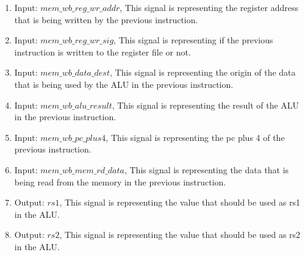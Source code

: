 \begin{enumerate}[label={\textbullet}]
    \item Input: $mem\_wb\_reg\_wr\_addr$, This signal is representing the register address that is being written by the previous instruction.
    \item Input: $mem\_wb\_reg\_wr\_sig$, This signal is representing if the previous instruction is written to the register file or not.
    \item Input: $mem\_wb\_data\_dest$, This signal is representing the origin of the data that is being used by the ALU in the previous instruction.
    \item Input: $mem\_wb\_alu\_result$, This signal is representing the result of the ALU in the previous instruction.
    \item Input: $mem\_wb\_pc\_plus4$, This signal is representing the pc plus 4 of the previous instruction.
    \item Input: $mem\_wb\_mem\_rd\_data$, This signal is representing the data that is being read from the memory in the previous instruction.
    \item Output: $rs1$, This signal is representing the value that should be used as rs1 in the ALU.
    \item Output: $rs2$, This signal is representing the value that should be used as rs2 in the ALU.
\end{enumerate}